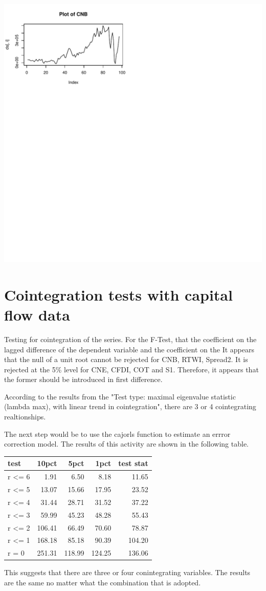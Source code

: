 \documentclass{article}\usepackage{graphicx, color}
\makeatletter
\def\maxwidth{ %
  \ifdim\Gin@nat@width>\linewidth
    \linewidth
  \else
    \Gin@nat@width
  \fi
}
\makeatother
\begin{document}
\includegraphics[width=\maxwidth]{figure/ur} 



\section{Cointegration tests with capital flow data}
Testing for cointegration of the series.  For the F-Test, that the coefficient on the lagged difference of the dependent variable and the coefficient on the It appears that the null of a unit root cannot be rejected for CNB, RTWI, Spread2. It is rejected at the 5\% level for CNE, CFDI, COT and S1.  Therefore, it appears that the former should be introduced in first difference. 



According to the results from the "Test type: maximal eigenvalue statistic (lambda max), with linear trend in cointegration", there are 3 or 4 cointegrating realtionships.  


The next step would be to use the cajorls function to estimate an errror correction model. The results of this activity are shown in the following table.

\begin{tabular}{l | r r r r}
test  & 10pct   &   5pct &   1pct & test stat\\
\hline
r <= 6 &   1.91 &  6.50  & 8.18   & 11.65\\
r <= 5 &  13.07 & 15.66  & 17.95  & 23.52\\
r <= 4 &  31.44 & 28.71  & 31.52  & 37.22\\
r <= 3 &  59.99 & 45.23  & 48.28  & 55.43\\
r <= 2 & 106.41 & 66.49  & 70.60  & 78.87\\
r <= 1 & 168.18 & 85.18  & 90.39  & 104.20\\
r = 0  & 251.31 & 118.99 & 124.25 & 136.06\\
\end{tabular}

This suggests that there are three or four conintegrating variables.  The results are the same no matter what the combination that is adopted.  
\end{document}
